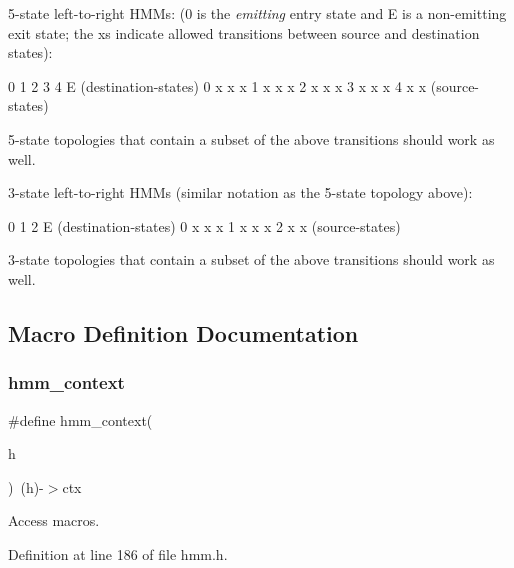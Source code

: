 5-\/state left-\/to-\/right H\+M\+Ms\+: (0 is the {\itshape emitting} entry state and E is a non-\/emitting exit state; the x\textquotesingle{}s indicate allowed transitions between source and destination states)\+:


\begin{DoxyPre}
              0   1   2   3   4   E (destination-states)
          0   x   x   x
          1       x   x   x
          2           x   x   x
          3               x   x   x
          4                   x   x
   (source-states)
\end{DoxyPre}


5-\/state topologies that contain a subset of the above transitions should work as well.

3-\/state left-\/to-\/right H\+M\+Ms (similar notation as the 5-\/state topology above)\+:


\begin{DoxyPre}
              0   1   2   E (destination-states)
          0   x   x   x
          1       x   x   x
          2           x   x 
   (source-states)
\end{DoxyPre}


3-\/state topologies that contain a subset of the above transitions should work as well. 

\subsection{Macro Definition Documentation}
\mbox{\label{hmm_8h_a3756f3c269d928924bf783f57c90adef}} 
\subsubsection{hmm\+\_\+context}
{\footnotesize\ttfamily \#define hmm\+\_\+context(\begin{DoxyParamCaption}\item[{}]{h }\end{DoxyParamCaption})~(h)-\/$>$ctx}



Access macros. 



Definition at line 186 of file hmm.\+h.

\mbox{\label{hmm_8h_a90d5493e8a3ef5826a1158e02e3b055c}} 
